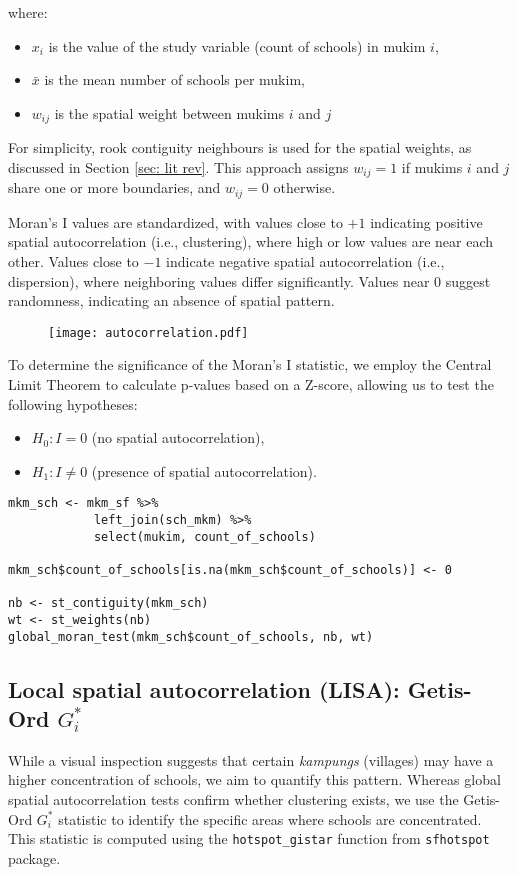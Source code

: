 \documentclass[12pt]{article}
\begin{document}
where:
\begin{itemize}
    \item $x_i$ is the value of the study variable (count of schools) in mukim $i$,
    \item $\bar{x}$ is the mean number of schools per mukim,
    \item $w_{ij}$ is the spatial weight between mukims $i$ and $j$
\end{itemize}

For simplicity, rook contiguity neighbours is used for the spatial weights, as discussed in Section \ref{sec: lit rev}. This approach assigns $w_{ij} = 1$ if mukims $i$ and $j$ share one or more boundaries, and $w_{ij} = 0$ otherwise. 

Moran’s I values are standardized, with values close to $+1$ indicating positive spatial autocorrelation (i.e., clustering), where high or low values are near each other. Values close to $-1$ indicate negative spatial autocorrelation (i.e., dispersion), where neighboring values differ significantly. Values near $0$ suggest randomness, indicating an absence of spatial pattern. 

\begin{figure}[htbp]
\centering
\texttt{[image: autocorrelation.pdf]}
\end{figure} 

To determine the significance of the Moran’s I statistic, we employ the Central Limit Theorem to calculate p-values based on a Z-score, allowing us to test the following hypotheses:
\begin{itemize}
    \item \( H_0: I = 0 \) (no spatial autocorrelation),
    \item \( H_1: I \neq 0 \) (presence of spatial autocorrelation).
\end{itemize}

\begin{tcolorbox}[title=Corresponding Codes]
\begin{verbatim}
mkm_sch <- mkm_sf %>% 
            left_join(sch_mkm) %>% 
            select(mukim, count_of_schools)

mkm_sch$count_of_schools[is.na(mkm_sch$count_of_schools)] <- 0

nb <- st_contiguity(mkm_sch)
wt <- st_weights(nb)
global_moran_test(mkm_sch$count_of_schools, nb, wt)
\end{verbatim}
\end{tcolorbox}

\subsection{Local spatial autocorrelation (LISA): Getis-Ord $G_i^*$}
\label{subsec: lisa}
While a visual inspection suggests that certain \textit{kampungs} (villages) may have a higher concentration of schools, we aim to quantify this pattern. Whereas global spatial autocorrelation tests confirm whether clustering exists, we use the Getis-Ord $G_i^*$ statistic to identify the specific areas where schools are concentrated. This statistic is computed using the \texttt{hotspot\_gistar} function from \texttt{sfhotspot} package.
\end{document}
